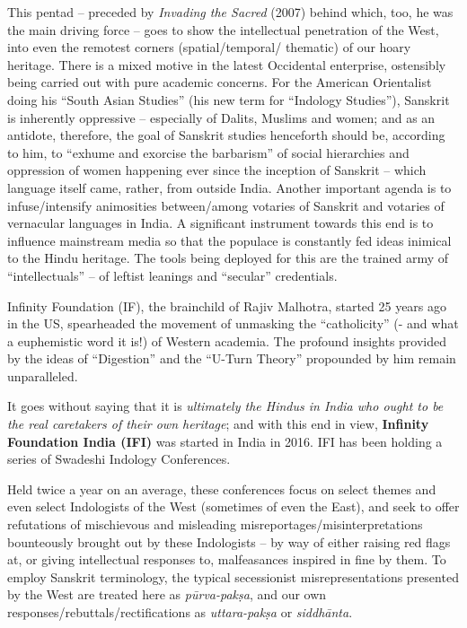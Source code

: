 This pentad – preceded by \textit{Invading the Sacred} (2007) behind which, too, he was the main driving force – goes to show the intellectual penetration of the West, into even the remotest corners (spatial/temporal/ thematic) of our hoary heritage. There is a mixed motive in the latest Occidental enterprise, ostensibly being carried out with pure academic concerns. For the American Orientalist doing his “South Asian Studies” (his new term for “Indology Studies”), Sanskrit is inherently oppressive – especially of Dalits, Muslims and women; and as an antidote, therefore, the goal of Sanskrit studies henceforth should be, according to him, to “exhume and exorcise the barbarism” of social hierarchies and oppression of women happening ever since the inception of Sanskrit – which language itself came, rather, from outside India. Another important agenda is to infuse/intensify animosities between/among votaries of Sanskrit and votaries of vernacular languages in India. A significant instrument towards this end is to influence mainstream media so that the populace is constantly fed ideas inimical to the Hindu heritage. The tools being deployed for this are the trained army of “intellectuals” – of leftist leanings and “secular” credentials.

Infinity Foundation (IF), the brainchild of Rajiv Malhotra, started 25 years ago in the US, spearheaded the movement of unmasking the “catholicity” (- and what a euphemistic word it is!) of Western academia. The profound insights provided by the ideas of “Digestion” and the “U-Turn Theory” propounded by him remain unparalleled.

It goes without saying that it is \textit{ultimately the Hindus in India who ought to be the real caretakers of their own heritage}; and with this end in view, \textbf{Infinity Foundation India (IFI)} was started in India in 2016. IFI has been holding a series of Swadeshi Indology Conferences. 

Held twice a year on an average, these conferences focus on select themes and even select Indologists of the West (sometimes of even the East), and seek to offer refutations of mischievous and misleading misreportages/misinterpretations bounteously brought out by these Indologists – by way of either raising red flags at, or giving intellectual responses to, malfeasances inspired in fine by them. To employ Sanskrit terminology, the typical secessionist misrepresentations presented by the West are treated here as \textit{pūrva-pakṣa}, and our own responses/rebuttals/rectifications as \textit{uttara-pakṣa} or \textit{siddhānta}. 

